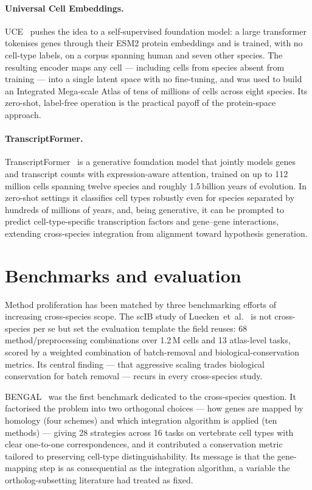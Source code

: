 \documentclass[10pt,twocolumn]{article}
\begin{document}
\paragraph{Universal Cell Embeddings.}
UCE~\cite{rosen2026} pushes the idea to a self-supervised foundation model: a large
transformer tokenises genes through their ESM2 protein embeddings and is trained,
with no cell-type labels, on a corpus spanning human and seven other species. The
resulting encoder maps any cell --- including cells from species absent from
training --- into a single latent space with no fine-tuning, and was used to build an
Integrated Mega-scale Atlas of tens of millions of cells across eight species. Its
zero-shot, label-free operation is the practical payoff of the protein-space
approach.

\paragraph{TranscriptFormer.}
TranscriptFormer~\cite{transcriptformer2025} is a generative foundation model that
jointly models genes and transcript counts with expression-aware attention, trained
on up to 112\,million cells spanning twelve species and roughly 1.5\,billion years of
evolution. In zero-shot settings it classifies cell types robustly even for species
separated by hundreds of millions of years, and, being generative, it can be prompted
to predict cell-type-specific transcription factors and gene--gene interactions,
extending cross-species integration from alignment toward hypothesis generation.

\section{Benchmarks and evaluation}
Method proliferation has been matched by three benchmarking efforts of increasing
cross-species scope. The scIB study of Luecken~et~al.~\cite{luecken2022} is not
cross-species per se but set the evaluation template the field reuses: 68
method/preprocessing combinations over 1.2\,M cells and 13 atlas-level tasks, scored
by a weighted combination of batch-removal and biological-conservation metrics. Its
central finding --- that aggressive scaling trades biological conservation for batch
removal --- recurs in every cross-species study.

BENGAL~\cite{song2023} was the first benchmark dedicated to the cross-species
question. It factorised the problem into two orthogonal choices --- how genes are
mapped by homology (four schemes) and which integration algorithm is applied (ten
methods) --- giving 28 strategies across 16 tasks on vertebrate cell types with clear
one-to-one correspondences, and it contributed a conservation metric tailored to
preserving cell-type distinguishability. Its message is that the gene-mapping step is
as consequential as the integration algorithm, a variable the ortholog-subsetting
literature had treated as fixed.
\end{document}

